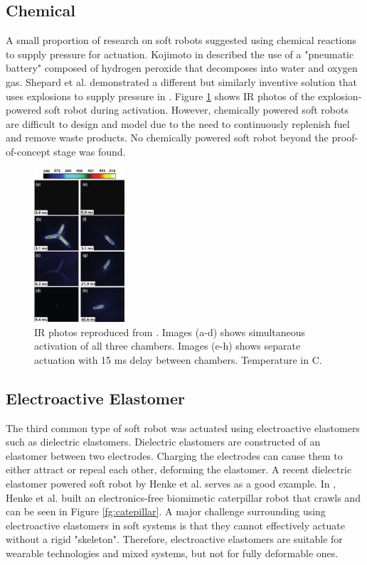 \documentclass[a4paper,12pt]{article}
\begin{document}
\subsection{Chemical}
A small proportion of research on soft robots suggested using chemical reactions to supply pressure for actuation. Kojimoto in \cite{kojimotoPneumaticBatteryChemical2012} described the use of a "pneumatic battery" composed of hydrogen peroxide that decomposes into water and oxygen gas. Shepard et al. demonstrated a different but similarly inventive solution that uses explosions to supply pressure in \cite{shepherdUsingExplosionsPower2013}. Figure \ref{fg:explosions} shows IR photos of the explosion-powered soft robot during activation. However, chemically powered soft robots are difficult to design and model due to the need to continuously replenish fuel and remove waste products. No chemically powered soft robot beyond the proof-of-concept stage was found.

\begin{figure}[h!]
    \centering
    \includegraphics[width=0.3\textwidth]{explosions.png}
    \caption{IR photos reproduced from \cite{shepherdUsingExplosionsPower2013}. Images (a-d) shows simultaneous activation of all three chambers. Images (e-h) shows separate actuation with 15 ms delay between chambers. Temperature in \degree C.}
    \label{fg:explosions}
\end{figure}

\subsection{Electroactive Elastomer}
The third common type of soft robot was actuated using electroactive elastomers such as dielectric elastomers. Dielectric elastomers are constructed of an elastomer between two electrodes. Charging the electrodes can cause them to either attract or repeal each other, deforming the elastomer. A recent dielectric elastomer powered soft robot by Henke et al. \cite{henkeSoftDielectricElastomer2017} serves as a good example. In \cite{henkeSoftDielectricElastomer2017}, Henke et al. built an electronics-free biomimetic caterpillar robot that crawls and can be seen in Figure \ref{fg:catepillar}. A major challenge surrounding using electroactive elastomers in soft systems is that they cannot effectively actuate without a rigid "skeleton". Therefore, electroactive elastomers are suitable for wearable technologies and mixed systems, but not for fully deformable ones.
\end{document}
